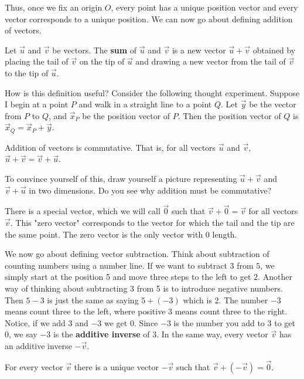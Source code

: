 Thus, once we fix an origin $O$, every point has a unique position vector and every vector corresponds to a unique position. We can now go about defining addition of vectors.

\begin{definition}
	Let $\vec{u}$ and $\vec{v}$ be vectors. The \textbf{sum} of $\vec{u}$ and $\vec{v}$ is a new vector $\vec{u}+\vec{v}$ obtained by placing the tail of $\vec{v}$ on the tip of $\vec{u}$ and drawing a new vector from the tail of $\vec{v}$ to the tip of $\vec{u}$.
\end{definition}

How is this definition useful? Consider the following thought experiment. Suppose I begin at a point $P$ and walk in a straight line to a point $Q$. Let $\vec{y}$ be the vector from $P$ to $Q$, and $\vec{x}_P$ be the position vector of $P$. Then the position vector of $Q$ is $\vec{x}_Q = \vec{x}_P + \vec{y}$.

\begin{proposition}
	Addition of vectors is commutative. That is, for all vectors $\vec{u}$ and $\vec{v}$, $\vec{u} + \vec{v} = \vec{v} + \vec{u}$.
\end{proposition}

To convince yourself of this, draw yourself a picture representing $\vec{u}+\vec{v}$ and $\vec{v} + \vec{u}$ in two dimensions. Do you see why addition must be commutative?

There is a special vector, which we will call $\vec{0}$ such that $\vec{v} + \vec{0} = \vec{v}$ for all vectors $\vec{v}$. This "zero vector" corresponds to the vector for which the tail and the tip are the same point. The zero vector is the only vector with 0 length.

We now go about defining vector subtraction. Think about subtraction of counting numbers using a number line. If we want to subtract $3$ from $5$, we simply start at the position 5 and move three steps to the left to get $2$. Another way of thinking about subtracting 3 from 5 is to introduce negative numbers. Then $5 - 3$ is just the same as saying $5 + (-3)$ which is 2. The number $-3$ means count three to the left, where positive $3$ means count three to the right. Notice, if we add $3$ and $-3$ we get 0. Since $-3$ is the number you add to $3$ to get $0$, we say $-3$ is the \textbf{additive inverse} of $3$. In the same way, every vector $\vec{v}$ has an additive inverse $-\vec{v}$.

\begin{proposition}
	For every vector $\vec{v}$ there is a unique vector $-\vec{v}$ such that $\vec{v} + (-\vec{v}) = \vec{0}$.
\end{proposition}

